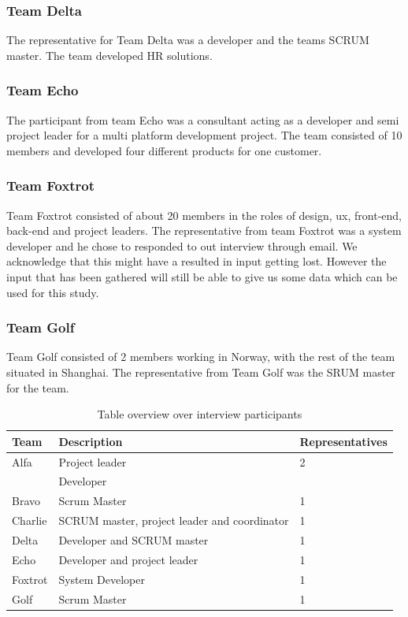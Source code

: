 \subsubsection{Team Delta}
The representative for Team Delta was a developer and the teams SCRUM master. The team developed HR solutions. 

\subsubsection{Team Echo}
The participant from team Echo was a consultant acting as a developer and semi project leader for a multi platform development project. The team consisted of 10 members and developed four different products for one customer.

\subsubsection{Team Foxtrot}
Team Foxtrot consisted of about 20 members in the roles of design, ux, front-end, back-end and project leaders. The representative from team Foxtrot was a system developer and he chose to responded to out interview through email. We acknowledge that this might have a resulted in input getting lost. However the input that has been gathered will still be able to give us some data which can be used for this study. 

\subsubsection{Team Golf}
Team Golf consisted of 2 members working in Norway, with the rest of the team situated in Shanghai. The representative from Team Golf was the SRUM master for the team. 

\begin{table}[!h]
	\begin{center}
	\caption{Table overview over interview participants}
	\label{table:participants}
	\begin{tabular}{l p{} l}
	\hline
	Team & Description & Representatives\\
	\hline
	Alfa & Project leader & 2 \\
	& Developer & \\
	Bravo & Scrum Master & 1  \\
	Charlie & SCRUM master, project leader and coordinator & 1 \\
	Delta & Developer and SCRUM master & 1 \\
	Echo & Developer and project leader & 1 \\
	Foxtrot & System Developer & 1 \\
	Golf & Scrum Master & 1 \\
	\hline
	\end{tabular}
	\end{center}
\end{table}

\clearpage